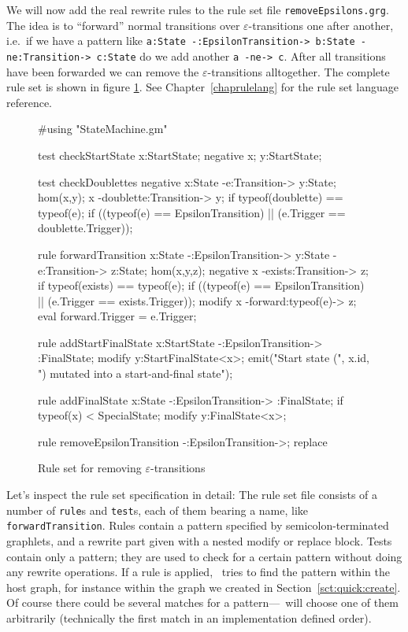 We will now add the real rewrite rules to the rule set file \texttt{removeEpsilons.grg}.
The idea is to ``forward'' normal transitions over $\varepsilon$-transitions one after another, i.e.\ if we have a pattern like \texttt{a:State -:EpsilonTransition-> b:State -ne:Transition-> c:State} do we add another \texttt{a -ne-> c}.
After all transitions have been forwarded we can remove the $\varepsilon$-transitions alltogether.
The complete rule set is shown in figure \ref{fig:quick:ruleset}.
See Chapter~\ref{chaprulelang} for the rule set language reference.

\begin{figure}[htbp]
	\centering
	\begin{grgen}
#using "StateMachine.gm"

test checkStartState {
    x:StartState;
    negative {
        x;
        y:StartState;
    }
}

test checkDoublettes {
    negative {
        x:State -e:Transition-> y:State;
        hom(x,y);
        x -doublette:Transition-> y;
        if {typeof(doublette) == typeof(e);}
        if { ((typeof(e) == EpsilonTransition) || (e.Trigger == doublette.Trigger)); }
    }
}

rule forwardTransition {
    x:State -:EpsilonTransition-> y:State -e:Transition-> z:State;
    hom(x,y,z);
    negative {
        x -exists:Transition-> z;
        if {typeof(exists) == typeof(e);}
        if { ((typeof(e) == EpsilonTransition) || (e.Trigger == exists.Trigger)); }
    }
    modify {
        x -forward:typeof(e)-> z;
        eval {forward.Trigger = e.Trigger;}
    }
}

rule addStartFinalState {
    x:StartState -:EpsilonTransition-> :FinalState;
    modify {
        y:StartFinalState<x>;
        emit("Start state (", x.id, ") mutated into a start-and-final state");
    }
}

rule addFinalState {
    x:State -:EpsilonTransition-> :FinalState;
    if {typeof(x) < SpecialState;}
    modify {
        y:FinalState<x>;
    }
}

rule removeEpsilonTransition {
    -:EpsilonTransition->;
    replace {}
}
	\end{grgen}
	\caption{Rule set for removing $\varepsilon$-transitions}
	\label{fig:quick:ruleset}
\end{figure}

Let's inspect the rule set specification in detail: The rule set file consists of a number of \texttt{rule}s and \texttt{test}s, each of them bearing a name, like \texttt{forwardTransition}.
Rules contain a pattern specified by semicolon-terminated graphlets, and a rewrite part given with a nested modify or replace block.
Tests contain only a pattern; they are used to check for a certain pattern without doing any rewrite operations.
If a rule is applied, \GrG\ tries to find the pattern within the host graph, for instance within the graph we created in Section~\ref{sct:quick:create}.
Of course there could be several matches for a pattern---\GrG\ will choose one of them arbitrarily (technically the first match in an implementation defined order).

